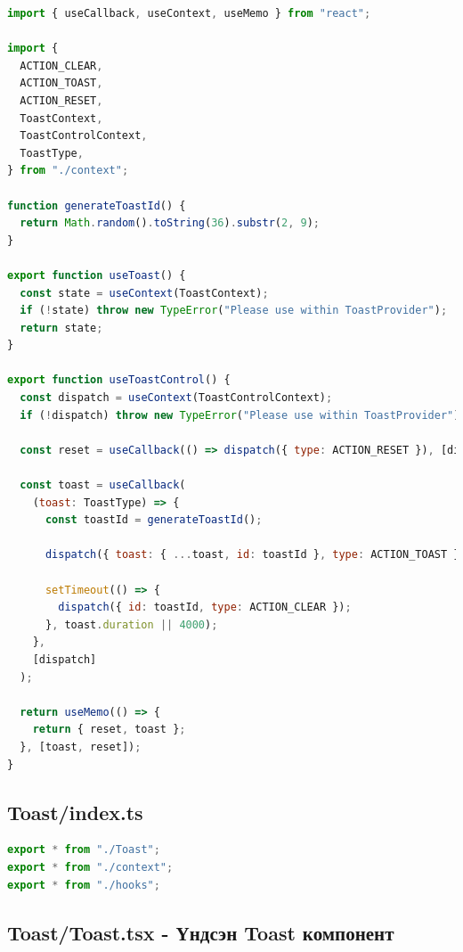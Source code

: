 \begin{lstlisting}[language=Javascript, frame=single]
import { useCallback, useContext, useMemo } from "react";

import {
  ACTION_CLEAR,
  ACTION_TOAST,
  ACTION_RESET,
  ToastContext,
  ToastControlContext,
  ToastType,
} from "./context";

function generateToastId() {
  return Math.random().toString(36).substr(2, 9);
}

export function useToast() {
  const state = useContext(ToastContext);
  if (!state) throw new TypeError("Please use within ToastProvider");
  return state;
}

export function useToastControl() {
  const dispatch = useContext(ToastControlContext);
  if (!dispatch) throw new TypeError("Please use within ToastProvider");

  const reset = useCallback(() => dispatch({ type: ACTION_RESET }), [dispatch]);

  const toast = useCallback(
    (toast: ToastType) => {
      const toastId = generateToastId();

      dispatch({ toast: { ...toast, id: toastId }, type: ACTION_TOAST });

      setTimeout(() => {
        dispatch({ id: toastId, type: ACTION_CLEAR });
      }, toast.duration || 4000);
    },
    [dispatch]
  );

  return useMemo(() => {
    return { reset, toast };
  }, [toast, reset]);
}
\end{lstlisting}

\subsection{Toast/index.ts}

\begin{lstlisting}[language=Javascript, frame=single]
export * from "./Toast";
export * from "./context";
export * from "./hooks";

\end{lstlisting}

\subsection{Toast/Toast.tsx - Үндсэн Toast компонент}

